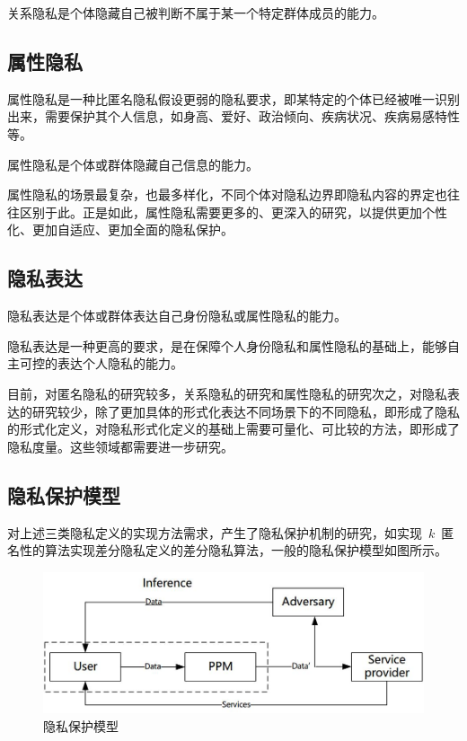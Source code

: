 \begin{definition}
	关系隐私是个体隐藏自己被判断不属于某一个特定群体成员的能力。
\end{definition}

\subsection{属性隐私}
属性隐私是一种比匿名隐私假设更弱的隐私要求，即某特定的个体已经被唯一识别出来，需要保护其个人信息，如身高、爱好、政治倾向、疾病状况、疾病易感特性等。

\begin{definition}
	属性隐私是个体或群体隐藏自己信息的能力。
\end{definition}

属性隐私的场景最复杂，也最多样化，不同个体对隐私边界即隐私内容的界定也往往区别于此。正是如此，属性隐私需要更多的、更深入的研究，以提供更加个性化、更加自适应、更加全面的隐私保护。

\subsection{隐私表达}

\begin{definition}
	隐私表达是个体或群体表达自己身份隐私或属性隐私的能力。
\end{definition}

隐私表达是一种更高的要求，是在保障个人身份隐私和属性隐私的基础上，能够自主可控的表达个人隐私的能力。

目前，对匿名隐私的研究较多，关系隐私的研究和属性隐私的研究次之，对隐私表达的研究较少，除了更加具体的形式化表达不同场景下的不同隐私，即形成了隐私的形式化定义，对隐私形式化定义的基础上需要可量化、可比较的方法，即形成了隐私度量。这些领域都需要进一步研究。

\subsection{隐私保护模型}

对上述三类隐私定义的实现方法需求，产生了隐私保护机制的研究，如实现~$k$~匿名性的算法\cite{sweeney2002k}实现差分隐私定义的差分隐私算法\cite{dwork2006differential}，一般的隐私保护模型如图\cite{cha1-ppm.jpg}所示。

\begin{figure}[htbp]
	\centering
	\includegraphics[width = 0.6\linewidth]{./figures/cha1-ppm.jpg}
	\caption{隐私保护模型}
	\label{fig:ppm-model}
\end{figure}

